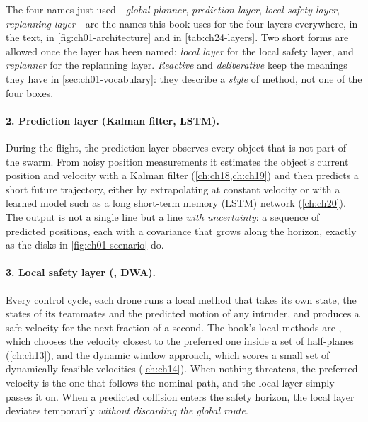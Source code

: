 The four names just used---\emph{global planner}, \emph{prediction layer}, \emph{local
safety layer}, \emph{replanning layer}---are the names this book uses for the four
layers everywhere, in the text, in \cref{fig:ch01-architecture} and in
\cref{tab:ch24-layers}. Two short forms are allowed once the layer has been named:
\emph{local layer} for the local safety layer, and \emph{replanner} for the replanning
layer. \emph{Reactive} and \emph{deliberative} keep the meanings they have in
\cref{sec:ch01-vocabulary}: they describe a \emph{style} of method, not one of the four
boxes.

\paragraph{2. Prediction layer (Kalman filter, LSTM).}
During the flight, the prediction layer observes every object that is not part of
the swarm. From noisy position measurements it estimates the object's current
position and velocity with a Kalman filter \cite{thrun2005probabilistic}
(\cref{ch:ch18,ch:ch19}) and then predicts a short future trajectory, either by
extrapolating at constant velocity or with a learned model such as a long
short-term memory (LSTM) network (\cref{ch:ch20}). The output is not a single line but a line \emph{with
uncertainty}: a sequence of predicted positions, each with a covariance that grows
along the horizon, exactly as the disks in \cref{fig:ch01-scenario} do.

\paragraph{3. Local safety layer (\orca, DWA).}
Every control cycle, each drone runs a local method that takes its own state, the
states of its teammates and the predicted motion of any intruder, and produces a safe
velocity for the next fraction of a second. The book's local methods are \orca
\cite{vandenberg2011orca}, which chooses the velocity closest to the preferred one
inside a set of half-planes (\cref{ch:ch13}), and the dynamic window approach, which
scores a small set of dynamically feasible velocities (\cref{ch:ch14}). When nothing
threatens, the preferred velocity is the one that follows the nominal path, and the
local layer simply passes it on. When a predicted collision enters the safety
horizon, the local layer deviates temporarily \emph{without discarding the global
route}.

